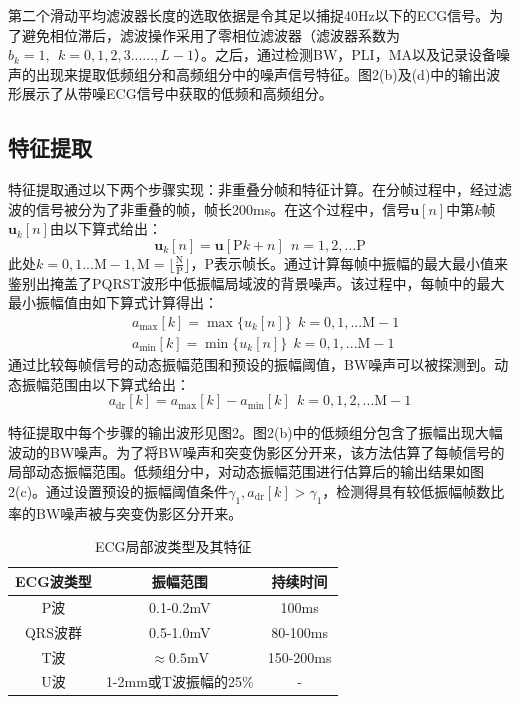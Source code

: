 第二个滑动平均滤波器长度的选取依据是令其足以捕捉40Hz以下的ECG信号。为了避免相位滞后，滤波操作采用了零相位滤波器（滤波器系数为$b_{k}=1,~~k=0,1,2,3......,L-1$）。之后，通过检测BW，PLI，MA以及记录设备噪声的出现来提取低频组分和高频组分中的噪声信号特征。图2(b)及(d)中的输出波形展示了从带噪ECG信号中获取的低频和高频组分。\\

\subsection{特征提取}
特征提取通过以下两个步骤实现：非重叠分帧和特征计算。在分帧过程中，经过滤波的信号被分为了非重叠的帧，帧长200ms。在这个过程中，信号$\mathbf{u}[n]$中第$k$帧$\mathbf{u}_{k}[n]$由以下算式给出：
\begin{equation}
  \mathbf{u}_{k}[n]=\mathbf{u}[\mathrm{P}k+n]~~n=1,2,...\mathrm{P}
  \label{equ4}
\end{equation}
此处$k=0,1...\mathrm{M}-1,\mathrm{M}=\lfloor\mathrm{\frac{N}{P}}\rfloor$，P表示帧长。通过计算每帧中振幅的最大最小值来鉴别出掩盖了PQRST波形中低振幅局域波的背景噪声。该过程中，每帧中的最大最小振幅值由如下算式计算得出：
\begin{equation}
\begin{aligned}
&a_{\max}[k]=\max \{u_{k}[n]\}~~k=0,1,...\mathrm{M-1} \\
&a_{\min}[k]=\min \{u_{k}[n]\}~~k=0,1,...\mathrm{M-1}
\end{aligned}
\label{equ5}
\end{equation}
通过比较每帧信号的动态振幅范围和预设的振幅阈值，BW噪声可以被探测到。动态振幅范围由以下算式给出：
\begin{equation}
a_{\mathrm{dr}}[k]=a_{\max}[k]-a_{\min}[k]~~k=0,1,2,...\mathrm{M}-1
 \label{equ6}
\end{equation}

特征提取中每个步骤的输出波形见图2。图2(b)中的低频组分包含了振幅出现大幅波动的BW噪声。为了将BW噪声和突变伪影区分开来，该方法估算了每帧信号的局部动态振幅范围。低频组分中，对动态振幅范围进行估算后的输出结果如图2(c)。通过设置预设的振幅阈值条件$\gamma_1,a_{\mathrm{dr}}[k]>\gamma_1$，检测得具有较低振幅帧数比率的BW噪声被与突变伪影区分开来。

\begin{table}[htbp]
\scriptsize
\centering
\caption{ECG局部波类型及其特征
\label{tabNo.1}}
\begin{tabular}{|c|c|c|}
\hline 
ECG波类型 & 振幅范围 & 持续时间 \\ 
\hline 
P波 & 0.1-0.2mV & 100ms \\ 
\hline 
QRS波群 & 0.5-1.0mV & 80-100ms \\ 
\hline 
T波 & $\approx0.5\mathrm{mV}$ & 150-200ms \\ 
\hline 
U波 & 1-2mm或T波振幅的25\% & - \\ 
\hline 
\end{tabular} 
\end{table}

